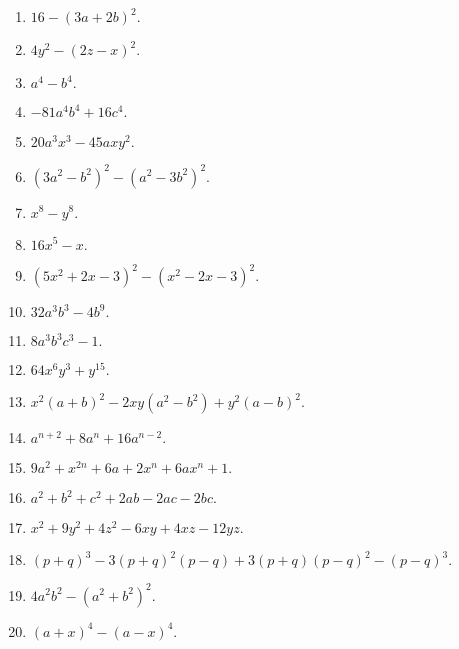\documentclass[a4paper,12pt]{article}
\begin{document}
\begin{multicols}{2}
\begin{enumerate}
\item $1 6 - ( 3 a + 2 b ) ^ { 2 } .$

\item $4 y ^ { 2 } - ( 2 z - x ) ^ { 2 } .$

\item $a ^ { 4 } - b ^ { 4 } .$

\item $- 8 1 a ^ { 4 } b ^ { 4 } + 1 6 c ^ { 4 } .$

\item $2 0 a ^ { 3 } x ^ { 3 } - 4 5 a x y ^ { 2 } .$

\item $( 3 a ^ { 2 } - b ^ { 2 } ) ^ { 2 } - ( a ^ { 2 } - 3 b ^ { 2 } ) ^ { 2 } .$

\item $x ^ { 8 } - y ^ { 8 } .$

\item $1 6 x ^ { 5 } - x .$

\item $( 5 x ^ { 2 } + 2 x - 3 ) ^ { 2 } - ( x ^ { 2 } - 2 x - 3 ) ^ { 2 } .$

\item $3 2 a ^ { 3 } b ^ { 3 } \! - \! 4 b ^ { 9 } .$

\item $8 a ^ { 3 } b ^ { 3 } c ^ { 3 } - 1 .$

\item $6 4 x ^ { 6 } y ^ { 3 } + y ^ { 1 5 } .$

\item $x ^ { 2 } ( a + b ) ^ { 2 } - 2 x y ( a ^ { 2 } - b ^ { 2 } ) + y ^ { 2 } ( a - b ) ^ { 2 } .$

\item $a ^ { n + 2 } + 8 a ^ { n } + 1 6 a ^ { n - 2 } . $

\item $9 a ^ { 2 } + x ^ { 2 n } + 6 a + 2 x ^ { n } + 6 a x ^ { n } + 1 .$

\item $a ^ { 2 } + b ^ { 2 } + c ^ { 2 } + 2 a b - 2 a c - 2 b c .$

\item $ x ^ { 2 } + 9 y ^ { 2 } + 4 z ^ { 2 } - 6 x y + 4 x z - 1 2 y z .$

\item $( p + q ) ^ { 3 } - 3 ( p + q ) ^ { 2 } ( p - q ) + 3 ( p + q ) ( p - q ) ^ { 2 } - ( p - q ) ^ { 3 } .$

\item $ 4 a ^ { 2 } b ^ { 2 } - ( a ^ { 2 } + b ^ { 2 } ) ^ { 2 } .$

\item $( a + x ) ^ { 4 } - ( a - x ) ^ { 4 } .$
\end{enumerate}
\end{multicols}
\end{document}
